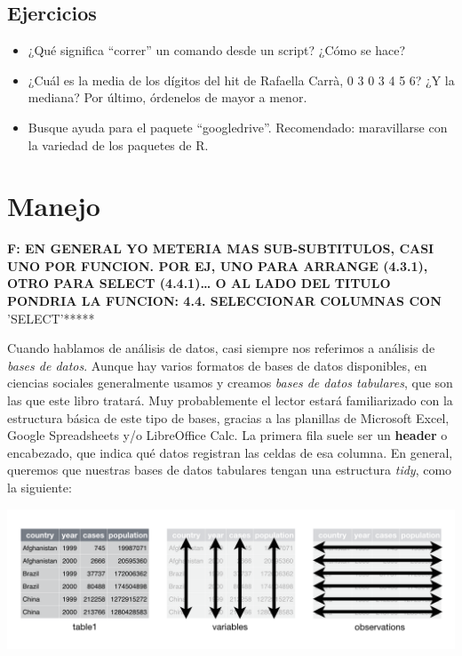 \documentclass[]{book}
\providecommand{\tightlist}{%
  \setlength{\itemsep}{0pt}\setlength{\parskip}{0pt}}
\begin{document}
\hypertarget{ejercicios}{%
\section{Ejercicios}\label{ejercicios}}

\begin{itemize}
\tightlist
\item
  ¿Qué significa ``correr'' un comando desde un script? ¿Cómo se hace?
\item
  ¿Cuál es la media de los dígitos del hit de Rafaella Carrà, 0 3 0 3 4
  5 6? ¿Y la mediana? Por último, órdenelos de mayor a menor.
\item
  Busque ayuda para el paquete ``googledrive''. Recomendado:
  maravillarse con la variedad de los paquetes de R.
\end{itemize}

\hypertarget{manejo}{%
\chapter{Manejo}\label{manejo}}

\textbf{F: EN GENERAL YO METERIA MAS SUB-SUBTITULOS, CASI UNO POR
FUNCION. POR EJ, UNO PARA ARRANGE (4.3.1), OTRO PARA SELECT
(4.4.1)\ldots{} O AL LADO DEL TITULO PONDRIA LA FUNCION: 4.4.
SELECCIONAR COLUMNAS CON }'SELECT'*****

Cuando hablamos de análisis de datos, casi siempre nos referimos a
análisis de \emph{bases de datos}. Aunque hay varios formatos de bases
de datos disponibles, en ciencias sociales generalmente usamos y creamos
\emph{bases de datos tabulares}, que son las que este libro tratará. Muy
probablemente el lector estará familiarizado con la estructura básica de
este tipo de bases, gracias a las planillas de Microsoft Excel, Google
Spreadsheets y/o LibreOffice Calc. La primera fila suele ser un
\textbf{header} o encabezado, que indica qué datos registran las celdas
de esa columna. En general, queremos que nuestras bases de datos
tabulares tengan una estructura \emph{tidy}, como la siguiente:

\begin{center}\includegraphics[width=0.6\linewidth]{00-images/manejo_tidy-4} \end{center}
\end{document}
